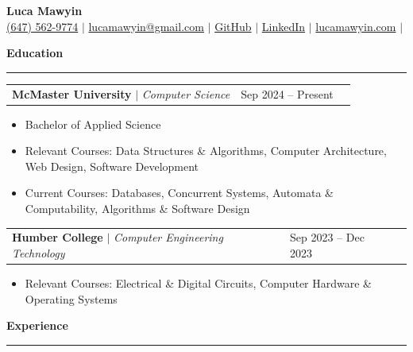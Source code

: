 \documentclass[letterpaper]{article}
\newcommand{\ressection}[1]{
    \vspace{1.0em}
    \noindent\textbf{\large #1}
    \par\vspace{0.3em}
    \hrule
    \vspace{0.6em}
}
\begin{document}
\begin{center}
    {\Huge \textbf{Luca Mawyin}} \\[1em]
    \href{tel:+16475629774}{(647) 562-9774} $|$
    \href{mailto:lucamawyin@gmail.com}{lucamawyin@gmail.com} $|$
    \href{https://github.com/LucaMawyin}{GitHub} $|$
    \href{https://www.linkedin.com/in/lucamawyin/}{LinkedIn} $|$
    \href{https://lucamawyin.com}{lucamawyin.com} $|$
\end{center}

\ressection{Education}

\begin{tabularx}{\textwidth}{X l r}
    \textbf{McMaster University} $|$ \textit{Computer Science} & Sep 2024 -- Present \\
\end{tabularx}

\vspace{-0.5em}

\begin{itemize}[ leftmargin=2.5em, itemsep=-0.2em ]
    \item Bachelor of Applied Science
    \item \parbox[t]{\dimexpr\linewidth-2.5em}{Relevant Courses: Data Structures \& Algorithms, Computer Architecture, Web Design, Software Development}
    \item Current Courses: Databases, Concurrent Systems, Automata \& Computability, Algorithms \& Software Design
\end{itemize}

\vspace{-0.5em}

\begin{tabularx}{\textwidth}{X l r}
    \textbf{Humber College} $|$ \textit{Computer Engineering Technology} & Sep 2023 -- Dec 2023 \\
\end{tabularx}

\vspace{-0.5em}

\begin{itemize}[ leftmargin=2.5em, itemsep=-0.2em ]
    \item \parbox[t]{\dimexpr\linewidth-2.5em}{Relevant Courses: Electrical \& Digital Circuits, Computer Hardware \& Operating Systems}
\end{itemize}

\ressection{Experience}
\end{document}
